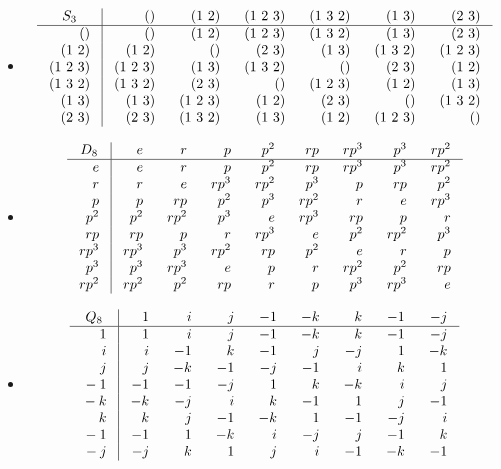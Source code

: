 \documentclass[10pt]{article}
\newcommand{\sk}{\vskip 10mm}
\theoremstyle{plain}
\theoremstyle{remark}
\begin{document}
\begin{itemize}
\item
  \[ {\setlength{\arraycolsep}{2ex}
    \begin{array}
      {r|*{6}{r}}
      \multicolumn{1}{c|}
      {S_3}&()&(1\ 2)&(1\ 2\ 3)&(1\ 3\ 2)&(1\ 3)&(2\ 3)\\
      \hline
      {}()&()&(1\ 2)&(1\ 2\ 3)&(1\ 3\ 2)&(1\ 3)&(2\ 3)\\
      {}(1\ 2)&(1\ 2)&()&(2\ 3)&(1\ 3)&(1\ 3\ 2)&(1\ 2\ 3)\\
      {}(1\ 2\ 3)&(1\ 2\ 3)&(1\ 3)&(1\ 3\ 2)&()&(2\ 3)&(1\ 2)\\
      {}(1\ 3\ 2)&(1\ 3\ 2)&(2\ 3)&()&(1\ 2\ 3)&(1\ 2)&(1\ 3)\\
      {}(1\ 3)&(1\ 3)&(1\ 2\ 3)&(1\ 2)&(2\ 3)&()&(1\ 3\ 2)\\
      {}(2\ 3)&(2\ 3)&(1\ 3\ 2)&(1\ 3)&(1\ 2)&(1\ 2\ 3)&()\\
    \end{array}}
  \]
\item
  \[
    {\setlength{\arraycolsep}{2ex}
      \begin{array}{r|*{8}{r}}
        \multicolumn{1}{c|}{D_8}&e&r&p&p^2&rp&rp^3&p^3&rp^2\\\hline
        {}e&e&r&p&p^2&rp&rp^3&p^3&rp^2\\
        {}r&r&e&rp^3&rp^2&p^3&p&rp&p^2\\
        {}p&p&rp&p^2&p^3&rp^2&r&e&rp^3\\
        {}p^2&p^2&rp^2&p^3&e&rp^3&rp&p&r\\
        {}rp&rp&p&r&rp^3&e&p^2&rp^2&p^3\\
        {}rp^3&rp^3&p^3&rp^2&rp&p^2&e&r&p\\
        {}p^3&p^3&rp^3&e&p&r&rp^2&p^2&rp\\
        {}rp^2&rp^2&p^2&rp&r&p&p^3&rp^3&e\\
      \end{array}}
  \]
\item
  \[
    {\setlength{\arraycolsep}{2ex}
      \begin{array}{r|*{8}{r}}
        \multicolumn{1}{c|}{Q_8}&1&i&j&-1&-k&k&-1&-j\\\hline
        {}1&1&i&j&-1&-k&k&-1&-j\\
        {}i&i&-1&k&-1&j&-j&1&-k\\
        {}j&j&-k&-1&-j&-1&i&k&1\\
        {}-1&-1&-1&-j&1&k&-k&i&j\\
        {}-k&-k&-j&i&k&-1&1&j&-1\\
        {}k&k&j&-1&-k&1&-1&-j&i\\
        {}-1&-1&1&-k&i&-j&j&-1&k\\
        {}-j&-j&k&1&j&i&-1&-k&-1\\
      \end{array}}
  \] 
\end{itemize}
\sk

\end{document}
